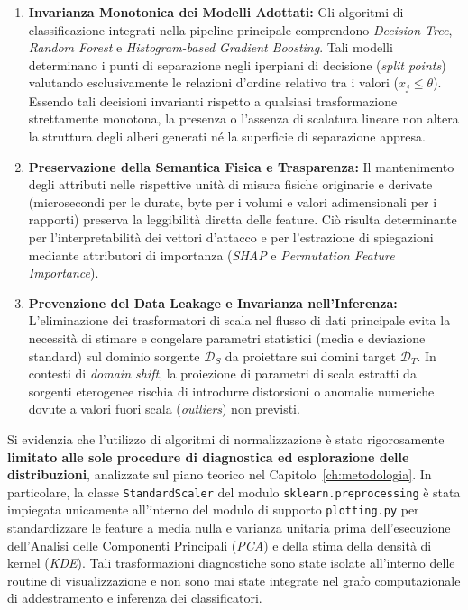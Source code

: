\begin{enumerate}
    \item \textbf{Invarianza Monotonica dei Modelli Adottati:}
    Gli algoritmi di classificazione integrati nella pipeline principale comprendono \textit{Decision Tree}, \textit{Random Forest} e \textit{Histogram-based Gradient Boosting}. 
    Tali modelli determinano i punti di separazione negli iperpiani di decisione (\textit{split points}) valutando esclusivamente le relazioni d'ordine relativo tra i valori ($x_j \le \theta$). 
    Essendo tali decisioni invarianti rispetto a qualsiasi trasformazione strettamente monotona, la presenza o l'assenza di scalatura lineare non altera la struttura degli alberi generati né la superficie di separazione appresa.

    \item \textbf{Preservazione della Semantica Fisica e Trasparenza:}
    Il mantenimento degli attributi nelle rispettive unità di misura fisiche originarie e derivate (microsecondi per le durate, byte per i volumi e valori adimensionali per i rapporti) preserva la leggibilità diretta delle feature. 
    Ciò risulta determinante per l'interpretabilità dei vettori d'attacco e per l'estrazione di spiegazioni mediante attributori di importanza (\textit{SHAP} e \textit{Permutation Feature Importance}).

    \item \textbf{Prevenzione del Data Leakage e Invarianza nell'Inferenza:}
    L'eliminazione dei trasformatori di scala nel flusso di dati principale evita la necessità di stimare e congelare parametri statistici (media e deviazione standard) sul dominio sorgente $\mathcal{D}_S$ da proiettare sui domini target $\mathcal{D}_T$. 
    In contesti di \textit{domain shift}, la proiezione di parametri di scala estratti da sorgenti eterogenee rischia di introdurre distorsioni o anomalie numeriche dovute a valori fuori scala (\textit{outliers}) non previsti.
\end{enumerate}

Si evidenzia che l'utilizzo di algoritmi di normalizzazione è stato rigorosamente \textbf{limitato alle sole procedure di diagnostica ed esplorazione delle distribuzioni}, analizzate sul piano teorico nel Capitolo~\ref{ch:metodologia}. 
In particolare, la classe \texttt{StandardScaler} del modulo \texttt{sklearn.preprocessing} è stata impiegata unicamente all'interno del modulo di supporto \texttt{plotting.py} per standardizzare le feature a media nulla e varianza unitaria prima dell'esecuzione dell'Analisi delle Componenti Principali (\textit{PCA}) e della stima della densità di kernel (\textit{KDE}). 
Tali trasformazioni diagnostiche sono state isolate all'interno delle routine di visualizzazione e non sono mai state integrate nel grafo computazionale di addestramento e inferenza dei classificatori.


